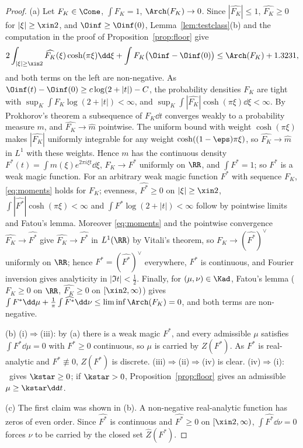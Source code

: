 \begin{proof}
(a) Let $F_K\in\Cone$, $\int F_K=1$, $\Arch(F_K)\to0$. Since $|\widehat{F_K}|\le1$, $\widehat{F_K}\ge0$ for $|\xi|\ge\xin2$, and
$\Oinf\ge\Oinf(0)$, Lemma~\ref{lem:testclass}(b) and the computation in the proof of Proposition~\ref{prop:floor} give
\begin{equation}\label{eq:moments}
2\int_{|\xi|\ge\xin2}\widehat{F_K}(\xi)\cosh(\pi\xi)\dd\xi+\int F_K\big(\Oinf-\Oinf(0)\big)\le\Arch(F_K)+1.3231 ,
\end{equation}
and both terms on the left are non-negative. As $\Oinf(t)-\Oinf(0)\ge c\log(2+|t|)-C$, the probability densities $F_K$ are
tight with $\sup_K\int F_K\log(2+|t|)<\infty$, and $\sup_K\int|\widehat{F_K}|\cosh(\pi\xi)\dd\xi<\infty$. By Prokhorov's theorem
a subsequence of $F_K\dd t$ converges weakly to a probability measure $m$, and $\widehat{F_K}\to\widehat m$ pointwise. The
uniform bound with weight $\cosh(\pi\xi)$ makes $|\widehat{F_K}|$ uniformly integrable for any weight
$\cosh((1-\eps)\pi\xi)$, so $\widehat{F_K}\to\widehat m$ in $L^1$ with these weights. Hence $m$ has the continuous density
$F^*(t)=\int\widehat m(\xi)e^{2\pi i\xi t}\dd\xi$, $F_K\to F^*$ uniformly on $\RR$, and $\int F^*=1$; so $F^*$ is a weak
magic function. For an arbitrary weak magic function $F^*$ with sequence $F_K$, \eqref{eq:moments} holds for $F_K$; evenness,
$\widehat{F^*}\ge0$ on $|\xi|\ge\xin2$, $\int|\widehat{F^*}|\cosh(\pi\xi)<\infty$ and $\int F^*\log(2+|t|)<\infty$ follow by
pointwise limits and Fatou's lemma. Moreover \eqref{eq:moments} and the pointwise convergence $\widehat{F_K}\to\widehat{F^*}$ give
$\widehat{F_K}\to\widehat{F^*}$ in $L^1(\RR)$ by Vitali's theorem, so $F_K\to(\widehat{F^*})^\vee$ uniformly on $\RR$; hence
$F^*=(\widehat{F^*})^\vee$ everywhere, $F^*$ is continuous, and Fourier inversion gives analyticity in $|\Im t|<\frac12$. Finally, for
$(\mu,\nu)\in\Kad$, Fatou's lemma ($F_K\ge0$ on $\RR$, $\widehat{F_K}\ge0$ on $[\xin2,\infty)$) gives
$\int F^*\dd\mu+\frac1\pi\int\widehat{F^*}\dd\nu\le\liminf\Arch(F_K)=0$, and both terms are non-negative.

(b) (i)$\Rightarrow$(iii): by (a) there is a weak magic $F^*$, and every admissible $\mu$ satisfies $\int F^*\dd\mu=0$ with
$F^*\ge0$ continuous, so $\mu$ is carried by $Z(F^*)$. As $F^*$ is real-analytic and $F^*\not\equiv0$, $Z(F^*)$ is discrete.
(iii)$\Rightarrow$(ii)$\Rightarrow$(iv) is clear. (iv)$\Rightarrow$(i): \condE\ gives $\kstar\ge0$; if $\kstar>0$,
Proposition~\ref{prop:floor} gives an admissible $\mu\ge\kstar\dd t$.

(c) The first claim was shown in (b). A non-negative real-analytic function has zeros of even order. Since $\widehat{F^*}$ is
continuous and $\widehat{F^*}\ge0$ on $[\xin2,\infty)$, $\int\widehat{F^*}\dd\nu=0$ forces $\nu$ to be carried by the closed set
$\widehat Z(F^*)$.
\end{proof}

